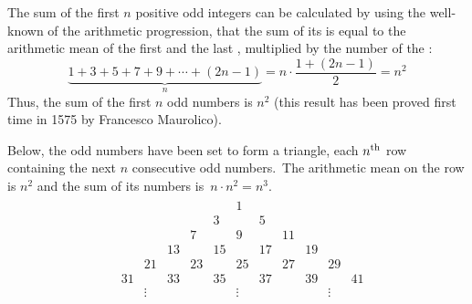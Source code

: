 \documentclass[12pt]{article}
\begin{document}
The sum of the first $n$ positive odd integers can be calculated by using the well-known  of the arithmetic progression, that the sum of its  is equal to the arithmetic mean of the first and the last , multiplied by the number of the :
 $$\underbrace{1+3+5+7+9+\cdots+(2n\!-\!1)}_{n} = 
     n\cdot\frac{1\!+\!(2n\!-\!1)}{2} = n^2$$
Thus, the sum of the first $n$ odd numbers is $n^2$ (this result has been proved first time in 1575 by Francesco Maurolico).

Below, the odd numbers have been set to form a triangle, each $n^{\rm{th}}$ row containing the next $n$ consecutive odd numbers.\, The arithmetic mean on the row is $n^2$ and the sum of its numbers is\, $n\cdot n^2 = n^3$.
\begin{eqnarray*}
\begin{array}{cccccccccccccccccc}
& & & & & & & & & 1 & & & & & & & &\\
& & & & & & & & 3 & & 5 & & & & & & &\\
& & & & & & & 7 & & 9 & & 11 & & & & & &\\
& & & & & & 13 & & 15 & & 17 & & 19 & & & & &\\
& & & & & 21 & & 23 & & 25 & & 27 & & 29 & & & &\\
& & & & 31 & & 33 & &35 & &37 & &39 & & 41 & & &\\
& & & & &\vdots & & & & \vdots & & & & \vdots& & & & \\
\end{array}
\end{eqnarray*}
\end{document}
